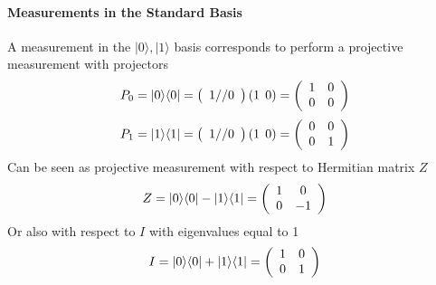 \documentclass[10pt]{report}
\begin{document}
\paragraph{Measurements in the Standard Basis} A measurement in the $|0\rangle, |1\rangle$ basis corresponds to perform a projective measurement with projectors $$P_0 = |0\rangle\langle 0| = \left(\begin{array}{c}1//0\end{array}\right) (1\:\:0) = \left(\begin{array}{c c}1&0\\0&0\end{array}\right)$$
$$P_1 = |1\rangle\langle 1| = \left(\begin{array}{c}1//0\end{array}\right) (1\:\:0) = \left(\begin{array}{c c}0&0\\0&1\end{array}\right)$$
Can be seen as projective measurement with respect to Hermitian matrix $Z$
$$Z = |0\rangle\langle 0| - |1\rangle\langle 1| = \left(\begin{array}{c c}
1&0\\0&-1
\end{array}\right)$$
Or also with respect to $I$ with eigenvalues equal to 1
$$I = |0\rangle\langle 0| + |1\rangle\langle 1| = \left(\begin{array}{c c}
1&0\\0&1
\end{array}\right)$$
\end{document}
